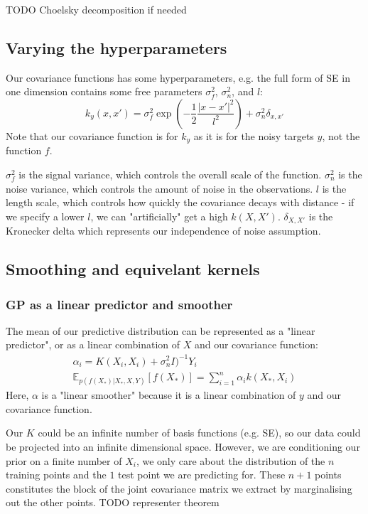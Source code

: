 \documentclass[10pt]{article}
\begin{document}
TODO Choelsky decomposition if needed


\subsection{Varying the hyperparameters \cite{gp-ml}}
Our covariance functions has some hyperparameters, e.g. the full form of SE in one dimension contains some free parameters $\sigma^2_f$, $\sigma^2_n$, and $l$:
\begin{equation*}
    k_y(x,x') = \sigma^2_f \exp\left(-\frac{1}{2}\frac{|x - x'|^2}{l^2}\right) + \sigma^2_n\delta_{x,x'}
\end{equation*}
Note that our covariance function is for $k_y$ as it is for the noisy targets $y$, not the function $f$.

$\sigma^2_f$ is the signal variance, which controls the overall scale of the function. $\sigma^2_n$ is the noise variance, which controls the amount of noise in the observations. $l$ is the length scale, which controls how quickly the covariance decays with distance - if we specify a lower $l$, we can "artificially" get a high $k(X,X')$. $\delta_{X,X'}$ is the Kronecker delta which represents our independence of noise assumption.


\subsection{Smoothing and equivelant kernels \cite{gp-ml}}

\subsubsection{GP as a linear predictor and smoother}
The mean of our predictive distribution can be represented as a "linear predictor", or as a linear combination of $X$ and our covariance function:
\begin{equation} \label{eq:gp_linear_predictor}
    \begin{aligned}
        \alpha_i = K(X_i, X_i) + \sigma_n^2I)^{-1}Y_i \\
        \mathbb{E}_{p(f(X_*)|X_*,X,Y)}[f(X_*)] = \sum_{i=1}^n \alpha_i k(X_*, X_i)
    \end{aligned}
\end{equation}
Here, $\alpha$ is a "linear smoother" because it is a linear combination of $y$ and our covariance function. 

Our $K$ could be an infinite number of basis functions (e.g. SE), so our data could be projected into an infinite dimensional space. However, we are conditioning our prior on a finite number of $X_i$, we only care about the distribution of the $n$ training points and the $1$ test point we are predicting for. These $n+1$ points constitutes the block of the joint covariance matrix we extract by marginalising out the other points.
TODO representer theorem
\end{document}
